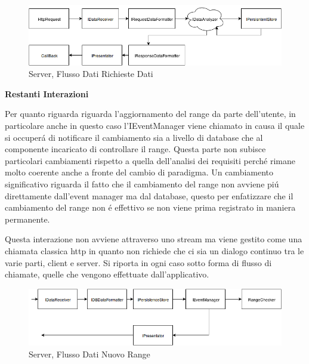 \begin{figure}[h]
\centering
\includegraphics[width=\textwidth]{Figures/LogicArchitecture/Server/FlowDiagramViewData}
\caption{Server, Flusso Dati Richieste Dati}
\end{figure}

\begin{center}
  \textbf{Restanti Interazioni}
\end{center}

Per quanto riguarda  riguarda l'aggiornamento del range da parte dell'utente, in particolare anche in questo caso l'IEventManager viene chiamato in causa il quale si occuper\'a di notificare il cambiamento sia a livello di database che al componente incaricato di controllare il range. Questa parte non subisce particolari cambiamenti rispetto a quella dell'analisi dei requisiti perch\'e rimane molto coerente anche a fronte del cambio di paradigma. Un cambiamento significativo riguarda il fatto che il cambiamento del range non avviene pi\'u direttamente dall'event manager ma dal database, questo per enfatizzare che il cambiamento del range non \'e effettivo se non viene prima registrato in maniera permanente.

Questa interazione non avviene attraverso uno stream ma viene gestito come una chiamata classica http in quanto non richiede che ci sia un dialogo continuo tra le varie parti, client e server. Si riporta in ogni caso sotto forma di flusso di chiamate, quelle che vengono effettuate dall'applicativo.

\begin{figure}[h]
\centering
\includegraphics[width=\textwidth]{Figures/LogicArchitecture/Server/FlowDiagramNewRange}
\caption{Server, Flusso Dati Nuovo Range}
\end{figure}

\newpage

